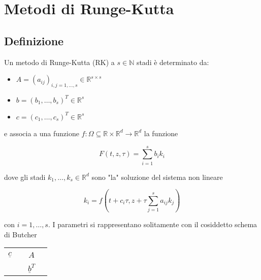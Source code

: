 \documentclass[hidelinks, 10pt]{report}
\begin{document}

\section{Metodi di Runge-Kutta}
\subsection{Definizione}
Un metodo di Runge-Kutta (RK) a $ s \in \mathbb{N} $ stadi \`e determinato da:

\begin{itemize}
\item $ A = (a_{ij})_{i, j = 1, \dotsc, s} \in \mathbb{R}^{s \times s} $
\item $ b = (b_{1}, \dotsc, b_{s})^{T} \in \mathbb{R}^{s} $
\item $ c = (c_{1}, \dotsc, c_{s})^{T} \in \mathbb{R}^{s} $ 
\end{itemize}

e associa a una funzione $ f: \Omega \subseteq \mathbb{R} \times \mathbb{R}^{d} \to \mathbb{R}^{d} $ la funzione

\[ F(t, z, \tau) = \sum\limits_{i = 1}^{s} b_{i} k_{i} \]

dove gli stadi $ k_{1}, \dotsc, k_{s} \in \mathbb{R}^{d} $ sono "la" soluzione del sistema non lineare

\begin{equation}	\label{eq:ki}
k_{i} = f \left( t + c_{i} \tau, z + \tau \sum\limits_{j = 1}^{s} a_{ij} k_{j} \right)
\end{equation}

con $ i = 1, \dotsc, s $. I parametri si rappresentano solitamente con il cosiddetto schema di Butcher

\begin{center}
\begin{tabular}{c|ccc}
                  &   &       & \\
$ \underline{c} $ &   & $ A $ & \\
				  &   &       & \\
\hline
				  &   & $ \underline{b}^{T} $ & \\
\end{tabular}
\end{center}
\end{document}
